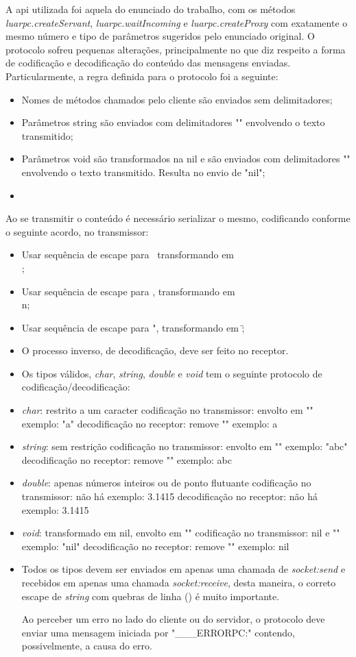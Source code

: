 \documentclass[11pt]{article}
\begin{document}
A \gls{api} utilizada foi aquela do enunciado do trabalho, com os métodos
\textit{luarpc.createServant}, \textit{luarpc.waitIncoming} e
\textit{luarpc.createProxy} com exatamente o mesmo número e tipo de parâmetros
sugeridos pelo enunciado original. O protocolo sofreu pequenas alterações,
principalmente no que diz respeito a forma de codificação e decodificação do
conteúdo das mensagens enviadas. Particularmente, a regra definida para o
protocolo foi a seguinte:

\begin{itemize}
\item
Nomes de métodos chamados pelo cliente são enviados sem delimitadores;
\item
Parâmetros string são enviados com delimitadores "" envolvendo o texto
transmitido;
\item
Parâmetros void são transformados na nil e são enviados com delimitadores "" envolvendo o texto
transmitido. Resulta no envio de "nil";
\item
\end{itemize}

Ao se transmitir o conteúdo é necessário serializar o mesmo, codificando
conforme o seguinte acordo, no transmissor:
\begin{itemize}
\item
Usar sequência de escape para \, transformando em \\;
\item
Usar sequência de escape para \n, transformando em \\n;
\item
Usar sequência de escape para ", transformando em \";
\item
O processo inverso, de decodificação, deve ser feito no receptor.
\item
Os tipos válidos, \textit{char}, \textit{string}, \textit{double} e
\textit{void} tem o seguinte protocolo de
codificação/decodificação:
\item
\textit{char}: restrito a um caracter
codificação no transmissor: envolto em ""
exemplo: "a"
decodificação no receptor: remove ""
exemplo: a
\item
\textit{string}: sem restrição
codificação no transmissor: envolto em ""
exemplo: "abc"
decodificação no receptor: remove ""
exemplo: abc
\item
\textit{double}: apenas números inteiros ou de ponto flutuante
codificação no transmissor: não há
exemplo: 3.1415
decodificação no receptor: não há
exemplo: 3.1415
\item
\textit{void}: transformado em nil, envolto em ""
codificação no transmissor: nil e ""
exemplo: "nil"
decodificação no receptor: remove ""
exemplo: nil
\item
Todos os tipos devem ser enviados em apenas uma chamada de \textit{socket:send}
e recebidos em apenas uma chamada \textit{socket:receive}, desta maneira, o
correto escape de \textit{string} com quebras de linha (\n) é muito importante.

Ao perceber um erro no lado do cliente ou do servidor, o protocolo deve enviar
uma mensagem iniciada por "___ERRORPC:" contendo, possivelmente, a causa do
erro.
\end{itemize}
\end{document}
